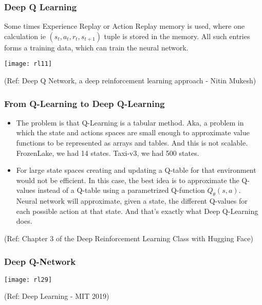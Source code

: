 \begin{frame}[fragile]\frametitle{Deep Q Learning}

Some times Experience Replay or Action Replay memory is used, where one calculation ie $(s_t,a_t,r_t,s_{t+1})$ tuple is stored in the memory. All such entries forms a training data, which can train the neural network.

\begin{center}
\texttt{[image: rl11]}
\end{center}

{\tiny (Ref: Deep Q Network, a deep reinforcement learning approach - Nitin Mukesh)}
\end{frame}


\begin{frame}[fragile]\frametitle{From Q-Learning to Deep Q-Learning}

\begin{itemize}
\item The problem is that Q-Learning is a tabular method. Aka, a problem in which the state and actions spaces are small enough to approximate value functions to be represented as arrays and tables. And this is not scalable. FrozenLake, we had 14 states. Taxi-v3, we had 500 states.
\item For large state spaces creating and updating a Q-table for that environment would not be efficient. In this case, the best idea is to approximate the Q-values instead of a Q-table using a parametrized Q-function $Q_{\theta}(s,a)$. Neural network will approximate, given a state, the different Q-values for each possible action at that state. And that's exactly what Deep Q-Learning does.
\end{itemize}


{\tiny (Ref: Chapter 3 of the Deep Reinforcement Learning Class with Hugging Face)}

\end{frame}

\begin{frame}[fragile]\frametitle{Deep Q-Network}
\begin{center}
\texttt{[image: rl29]}
\end{center}

{\tiny (Ref: Deep Learning - MIT 2019)}


\end{frame}


